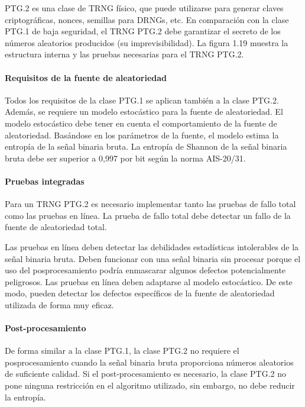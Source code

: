		PTG.2 es una clase de TRNG físico, que puede utilizarse para generar claves criptográficas, nonces, semillas para DRNGs, etc. En comparación con la clase PTG.1 de baja seguridad, el TRNG PTG.2 debe garantizar el secreto de los números aleatorios producidos (su imprevisibilidad). La figura 1.19 muestra la estructura interna y las pruebas necesarias para el TRNG PTG.2.
	
		\paragraph{Requisitos de la fuente de aleatoriedad\\}
		
			Todos los requisitos de la clase PTG.1 se aplican también a la clase PTG.2. Además, se requiere un modelo estocástico para la fuente de aleatoriedad. El modelo estocástico debe tener en cuenta el comportamiento de la fuente de aleatoriedad. Basándose en los parámetros de la fuente, el modelo estima la entropía de la señal binaria bruta. La entropía de Shannon de la señal binaria bruta debe ser superior a 0,997 por bit según la norma AIS-20/31.
		
		
		\paragraph{Pruebas integradas\\}
		
			Para un TRNG PTG.2 es necesario implementar tanto las pruebas de fallo total como las pruebas en línea. La prueba de fallo total debe detectar un fallo de la fuente de aleatoriedad total.

			 Las pruebas en línea deben detectar las debilidades estadísticas intolerables de la señal binaria bruta. Deben funcionar con una señal binaria sin procesar porque el uso del posprocesamiento podría enmascarar algunos defectos potencialmente peligrosos. Las pruebas en línea deben adaptarse al modelo estocástico. De este modo, pueden detectar los defectos específicos de la fuente de aleatoriedad utilizada de forma muy eficaz.

		\paragraph{Post-procesamiento\\}
		
			De forma similar a la clase PTG.1, la clase PTG.2 no requiere el posprocesamiento cuando la señal binaria bruta proporciona números aleatorios de suficiente calidad. Si el post-procesamiento es necesario, la clase PTG.2 no pone ninguna restricción en el algoritmo utilizado, sin embargo, no debe reducir la entropía.
		
